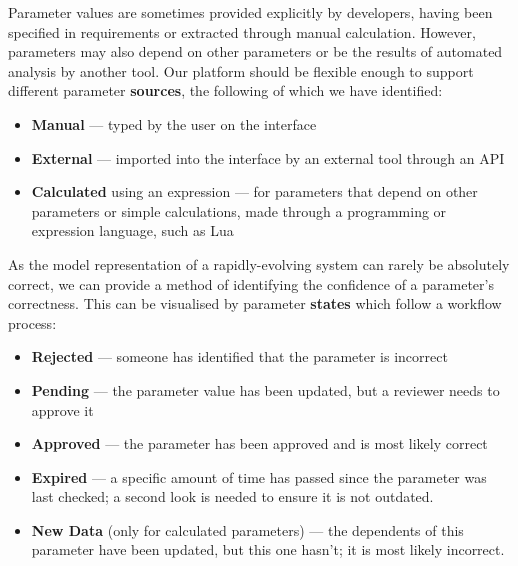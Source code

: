 \documentclass[]{iac}
\begin{document}
Parameter values are sometimes provided explicitly by developers, having been specified in requirements or extracted through manual calculation. However, parameters may also depend on other parameters or be the results of automated analysis by another tool. Our platform should be flexible enough to support different parameter \textbf{sources}, the following of which we have identified:
\begin{itemize}[itemsep=1ex]
    \item \textbf{Manual} --- typed by the user on the interface
    \item \textbf{External} --- imported into the interface by an external tool through an \acs{API}
    \item \textbf{Calculated} using an expression --- for parameters that depend on other parameters or simple calculations, made through a programming or expression language, such as Lua
\end{itemize}

As the model representation of a rapidly-evolving system can rarely be absolutely correct, we can provide a method of identifying the confidence of a parameter's correctness. This can be visualised by parameter \textbf{states} which follow a workflow process:
\begin{itemize}[itemsep=1ex]
    \item \textbf{Rejected} --- someone has identified that the parameter is incorrect
    \item \textbf{Pending} --- the parameter value has been updated, but a reviewer needs to approve it
    \item \textbf{Approved} --- the parameter has been approved and is most likely correct
    \item \textbf{Expired} --- a specific amount of time has passed since the parameter was last checked; a second look is needed to ensure it is not outdated.
    \item \textbf{New Data} (only for calculated parameters) --- the dependents of this parameter have been updated, but this one hasn't; it is most likely incorrect.
\end{itemize}
\end{document}
